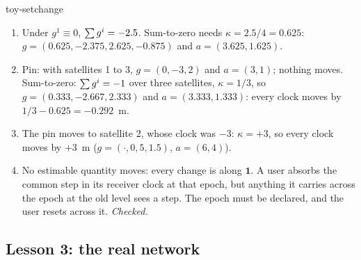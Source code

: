 \begin{answer}{toy-setchange}
\solution
\begin{enumerate}[leftmargin=*, itemsep=1pt]
\item Under $g^1 \equiv 0$, $\sum g^i = -2.5$. Sum-to-zero needs $\kappa = 2.5/4 =
      0.625$: $g = (0.625,\allowbreak -2.375,\allowbreak 2.625,\allowbreak -0.875)$
      and $a = (3.625, 1.625)$.
\item Pin: with satellites 1 to 3, $g = (0, -3, 2)$ and $a = (3, 1)$; nothing moves.
      Sum-to-zero: $\sum g^i = -1$ over three satellites, $\kappa = 1/3$, so $g = (0.333,
      -2.667, 2.333)$ and $a = (3.333, 1.333)$: every clock moves by $1/3 - 0.625 =
      -0.292$~m.
\item The pin moves to satellite 2, whose clock was $-3$: $\kappa = +3$, so every
      clock moves by $+3$~m ($g = (\cdot, 0, 5, 1.5)$, $a = (6, 4)$).
\item No estimable quantity moves: every change is along $\bm{1}$. A user absorbs
      the common step in its receiver clock at that epoch, but anything it carries
      across the epoch at the old level sees a step. The epoch must be declared, and
      the user resets across it. \emph{Checked.}
\end{enumerate}
\end{answer}

\subsection*{Lesson 3: the real network}

